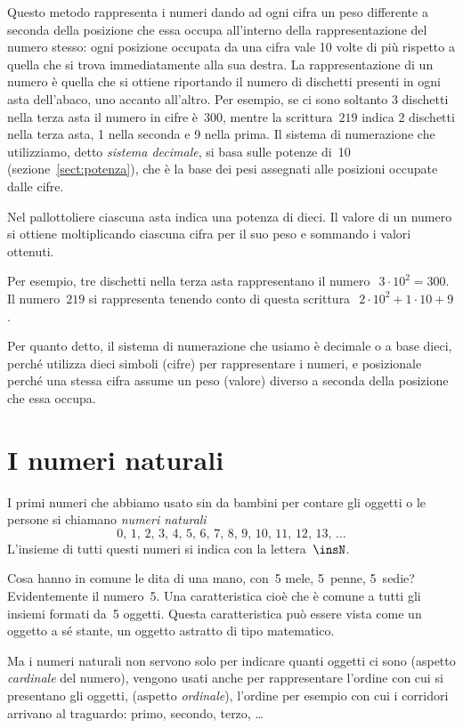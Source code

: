 Questo metodo rappresenta i numeri dando ad ogni cifra un peso differente a seconda della posizione che essa occupa all'interno della rappresentazione del numero stesso: ogni posizione occupata da una cifra vale 10 volte di più rispetto a quella che si trova immediatamente alla sua destra.
La rappresentazione di un numero è quella che si ottiene riportando il numero di dischetti presenti in ogni asta dell'abaco, uno accanto all'altro. Per esempio, se ci sono soltanto 3 dischetti nella terza asta il numero in cifre è~$300$, mentre la scrittura~$219$ indica 2 dischetti nella terza asta, 1 nella seconda e 9 nella prima.
Il sistema di numerazione che utilizziamo, detto \emph{sistema decimale}, si basa sulle potenze di~10 (sezione~\ref{sect:potenza}), che è la base dei pesi assegnati alle posizioni occupate dalle cifre.

Nel pallottoliere ciascuna asta indica una potenza di dieci. Il valore di un numero si ottiene moltiplicando ciascuna cifra per il suo peso e sommando i valori ottenuti.

Per esempio, tre dischetti nella terza asta rappresentano il numero~$~3\cdot 10^2=300$.
Il numero~$219$ si rappresenta tenendo conto di questa scrittura~$~2\cdot 10^2+1\cdot 10+9$.

Per quanto detto, il sistema di numerazione che usiamo è decimale o a base dieci, perché
utilizza dieci simboli (cifre) per rappresentare i numeri, e posizionale perché una stessa cifra
assume un peso (valore) diverso a seconda della posizione che essa occupa.

\section{I numeri naturali}

I primi numeri che abbiamo usato sin da bambini per contare gli oggetti o le persone si
chiamano \emph{numeri naturali}
\[ 0\text{,~}1\text{,~}2\text{,~}3\text{,~}4\text{,~}5\text{,~}6\text{,~}7\text{,~}8\text{,~}9\text{,~}10\text{,~}11\text{,~}12\text{,~}13\text{,~}\dots \]
L'insieme di tutti questi numeri si indica con la lettera~$\insN$.

Cosa hanno in comune le dita di una mano, con~5 mele, 5~penne, 5~sedie? Evidentemente
il numero~5. Una caratteristica cioè che è comune a tutti gli insiemi formati da~5
oggetti. Questa caratteristica può essere vista come un oggetto a sé stante, un oggetto
astratto di tipo matematico.

Ma i numeri naturali non servono solo per indicare quanti oggetti ci sono (aspetto
\emph{cardinale} del numero), vengono usati anche per rappresentare l'ordine con cui si
presentano gli oggetti, (aspetto \emph{ordinale}), l'ordine per esempio con cui i corridori
arrivano al traguardo: primo, secondo, terzo, \ldots

